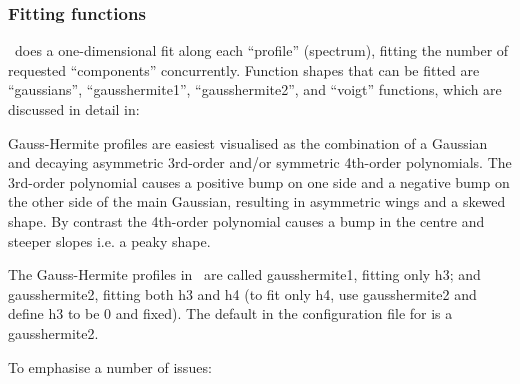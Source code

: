 \documentclass[oneside,11pt]{starlink}
\begin{document}
\subsubsection{Fitting functions}

\fitdd\ does a one-dimensional fit along each ``profile'' (spectrum),
fitting the number of requested ``components'' concurrently. Function
shapes that can be fitted are ``gaussians'', ``gausshermite1'',
``gausshermite2'', and ``voigt'' functions, which are discussed in
detail in:

\begin{terminalv}
\end{terminalv}

Gauss-Hermite profiles are easiest visualised as the combination of a
Gaussian and decaying asymmetric 3rd-order and/or symmetric 4th-order
polynomials. The 3rd-order polynomial causes a positive bump on one
side and a negative bump on the other side of the main Gaussian,
resulting in asymmetric wings and a skewed shape. By contrast the
4th-order polynomial causes a bump in the centre and steeper slopes
i.e. a peaky shape.

The Gauss-Hermite profiles in \fitdd\ are called gausshermite1,
fitting only h3; and gausshermite2, fitting both h3 and h4 (to fit
only h4, use gausshermite2 and define h3 to be 0 and fixed). The
default in the configuration file for  is a
gausshermite2.

To emphasise a number of issues:
\end{document}

